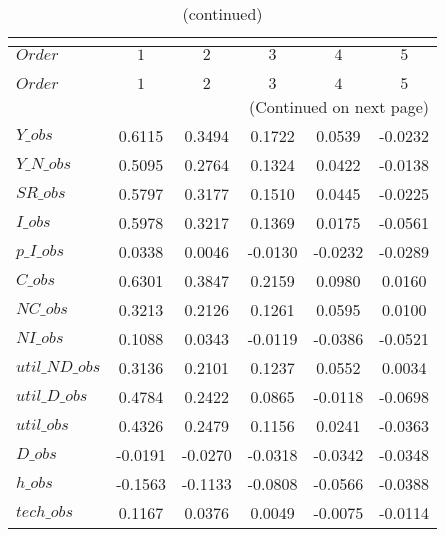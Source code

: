  
\begin{center}
\begin{longtable}{lccccc} 
\caption{COEFFICIENTS OF AUTOCORRELATION}\\
 \label{Table:th_autocorr_matrix}\\
\toprule 
$Order          $	 & 	 $          1$	 & 	 $          2$	 & 	 $          3$	 & 	 $          4$	 & 	 $          5$\\
\midrule \endfirsthead 
\caption{(continued)}\\
 \toprule \\ 
$Order          $	 & 	 $          1$	 & 	 $          2$	 & 	 $          3$	 & 	 $          4$	 & 	 $          5$\\
\midrule \endhead 
\midrule \multicolumn{6}{r}{(Continued on next page)} \\ \bottomrule \endfoot 
\bottomrule \endlastfoot 
$Y\_obs         $	 & 	     0.6115	 & 	     0.3494	 & 	     0.1722	 & 	     0.0539	 & 	    -0.0232 \\ 
$Y\_N\_obs      $	 & 	     0.5095	 & 	     0.2764	 & 	     0.1324	 & 	     0.0422	 & 	    -0.0138 \\ 
$SR\_obs        $	 & 	     0.5797	 & 	     0.3177	 & 	     0.1510	 & 	     0.0445	 & 	    -0.0225 \\ 
$I\_obs         $	 & 	     0.5978	 & 	     0.3217	 & 	     0.1369	 & 	     0.0175	 & 	    -0.0561 \\ 
$p\_I\_obs      $	 & 	     0.0338	 & 	     0.0046	 & 	    -0.0130	 & 	    -0.0232	 & 	    -0.0289 \\ 
$C\_obs         $	 & 	     0.6301	 & 	     0.3847	 & 	     0.2159	 & 	     0.0980	 & 	     0.0160 \\ 
$NC\_obs        $	 & 	     0.3213	 & 	     0.2126	 & 	     0.1261	 & 	     0.0595	 & 	     0.0100 \\ 
$NI\_obs        $	 & 	     0.1088	 & 	     0.0343	 & 	    -0.0119	 & 	    -0.0386	 & 	    -0.0521 \\ 
$util\_ND\_obs  $	 & 	     0.3136	 & 	     0.2101	 & 	     0.1237	 & 	     0.0552	 & 	     0.0034 \\ 
$util\_D\_obs   $	 & 	     0.4784	 & 	     0.2422	 & 	     0.0865	 & 	    -0.0118	 & 	    -0.0698 \\ 
$util\_obs      $	 & 	     0.4326	 & 	     0.2479	 & 	     0.1156	 & 	     0.0241	 & 	    -0.0363 \\ 
$D\_obs         $	 & 	    -0.0191	 & 	    -0.0270	 & 	    -0.0318	 & 	    -0.0342	 & 	    -0.0348 \\ 
$h\_obs         $	 & 	    -0.1563	 & 	    -0.1133	 & 	    -0.0808	 & 	    -0.0566	 & 	    -0.0388 \\ 
$tech\_obs      $	 & 	     0.1167	 & 	     0.0376	 & 	     0.0049	 & 	    -0.0075	 & 	    -0.0114 \\ 
\end{longtable}
 \end{center}
